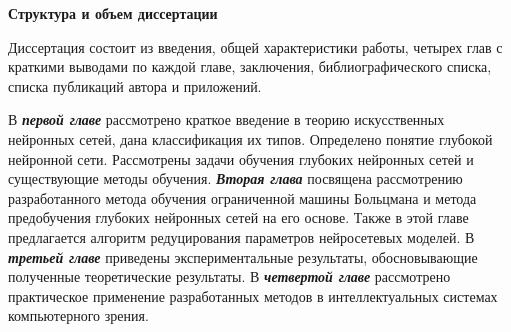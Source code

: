 \newcommand{\actuality}{\textbf{Связь работы с научными программами (проектами), темами}}
\newcommand{\aim}{\textbf{Цель, задачи, объект и предмет исследования}}
\newcommand{\novelty}{\textbf{Научная новизна}}
\newcommand{\defpositions}{\textbf{Положения, выносимые на защиту}}
\newcommand{\influence}{\textbf{Научная и практическая значимость}}
\newcommand{\reliability}{\textbf{Степень достоверности}}
\newcommand{\contribution}{\textbf{Личный вклад соискателя ученой степени в результаты диссертации}}
\newcommand{\probation}{\textbf{Апробация диссертации и информация об использовании ее результатов}}
\newcommand{\publications}{\textbf{Опубликованность результатов диссертации}}




\vspace{3mm}
\textbf{Структура и объем диссертации} 
\vspace{3mm}

Диссертация состоит из введения, общей характеристики работы, четырех глав с краткими выводами по каждой главе, заключения, библиографического списка, списка публикаций автора и приложений.

В \textbf{\textit{первой главе}} рассмотрено краткое введение в теорию искусственных нейронных сетей, дана классификация их типов. Определено понятие глубокой нейронной сети. Рассмотрены задачи обучения глубоких нейронных сетей и существующие методы обучения. \textbf{\textit{Вторая глава}} посвящена рассмотрению разработанного метода обучения ограниченной машины Больцмана и метода предобучения глубоких нейронных сетей на его основе. Также в этой главе предлагается алгоритм редуцирования параметров нейросетевых моделей. В \textbf{\textit{третьей главе}} приведены экспериментальные результаты, обосновывающие полученные теоретические результаты. В \textbf{\textit{четвертой главе}} рассмотрено практическое применение разработанных методов в интеллектуальных системах компьютерного зрения.


